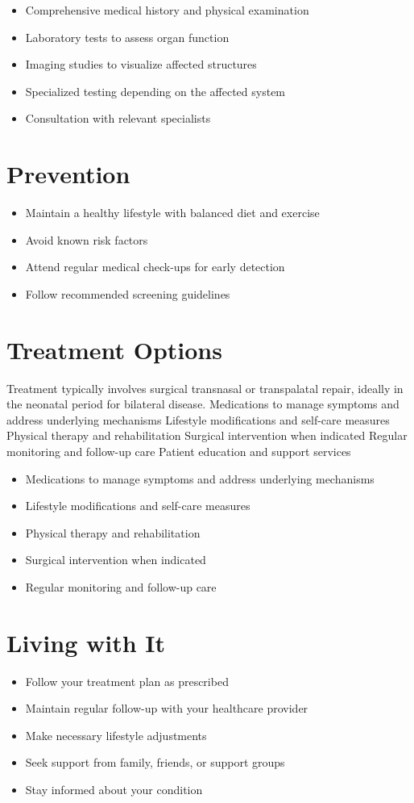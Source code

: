 \begin{itemize}[noitemsep]
  \item Comprehensive medical history and physical examination
  \item Laboratory tests to assess organ function
  \item Imaging studies to visualize affected structures
  \item Specialized testing depending on the affected system
  \item Consultation with relevant specialists
\end{itemize}
\section{Prevention}
\begin{itemize}[noitemsep]
  \item Maintain a healthy lifestyle with balanced diet and exercise
  \item Avoid known risk factors
  \item Attend regular medical check-ups for early detection
  \item Follow recommended screening guidelines
\end{itemize}
\section{Treatment Options}
Treatment typically involves surgical transnasal or transpalatal repair, ideally in the neonatal period for bilateral disease. Medications to manage symptoms and address underlying mechanisms Lifestyle modifications and self-care measures Physical therapy and rehabilitation Surgical intervention when indicated Regular monitoring and follow-up care Patient education and support services

\begin{itemize}[noitemsep]
  \item Medications to manage symptoms and address underlying mechanisms
  \item Lifestyle modifications and self-care measures
  \item Physical therapy and rehabilitation
  \item Surgical intervention when indicated
  \item Regular monitoring and follow-up care
\end{itemize}
\section{Living with It}
\begin{itemize}[noitemsep]
  \item Follow your treatment plan as prescribed
  \item Maintain regular follow-up with your healthcare provider
  \item Make necessary lifestyle adjustments
  \item Seek support from family, friends, or support groups
  \item Stay informed about your condition
\end{itemize}
